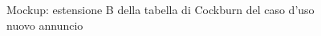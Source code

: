 \begin{figure}[ht]
    \caption{Mockup: estensione B della tabella di Cockburn del caso d'uso nuovo annuncio}
    \label{fig:mockup_estensione_B_aggiungi_annuncio}
\end{figure}

\newpage

